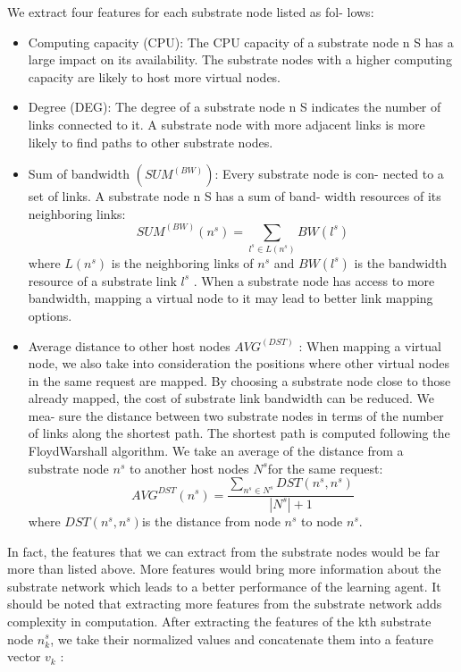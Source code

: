 \documentclass[12pt]{article}
\begin{document}
We extract four features for each substrate node listed as fol-
lows:
\begin{itemize}
	\item Computing capacity (CPU): The CPU capacity of a substrate
	node n S has a large impact on its availability. The substrate
	nodes with a higher computing capacity are likely to host more
	virtual nodes.
	\item Degree (DEG): The degree of a substrate node n S indicates the
	number of links connected to it. A substrate node with more
	adjacent links is more likely to find paths to other substrate
	nodes.
	\item Sum of bandwidth $(SUM^{(BW)})$: Every substrate node is con-
	nected to a set of links. A substrate node n S has a sum of band-
	width resources of its neighboring links:
	\begin{equation}
	SUM^{(BW)}(n^s) = \sum_{l^s \in L(n^s)}BW(l^s)
	\end{equation}
	where $L(n^s)$ is the neighboring links of $n^s$ and $BW(l^s)$ is the
	bandwidth resource of a substrate link $l^s$ . When a substrate
	node has access to more bandwidth, mapping a virtual node
	to it may lead to better link mapping options.
	\item  Average distance to other host nodes $AVG^{(DST)}$ : When mapping
	a virtual node, we also take into consideration the positions
	where other virtual nodes in the same request are mapped.
	By choosing a substrate node close to those already mapped,
	the cost of substrate link bandwidth can be reduced. We mea-
	sure the distance between two substrate nodes in terms of the
	number of links along the shortest path. The shortest path is
	computed following the FloydWarshall algorithm. We take
	an average of the distance from a substrate node $n^s$ to another host nodes $N^s$for the same request:
	\begin{equation}
	AVG^{DST}(n^s) = \frac{\sum_{n^s \in N^s}DST(n^s, n^s)}{|N^s| + 1}
	\end{equation}
	where $DST(n^s, n^s)$is the distance from node $n^s$ to node $n^s$.
\end{itemize}
In fact, the features that we can extract from the substrate
nodes would be far more than listed above. More features would
bring more information about the substrate network which leads
to a better performance of the learning agent. It should be noted
that extracting more features from the substrate network adds
complexity in computation.
After extracting the features of the kth substrate node $n_k^s$, we
take their normalized values and concatenate them into a feature
vector $v_k$ :
\end{document}
